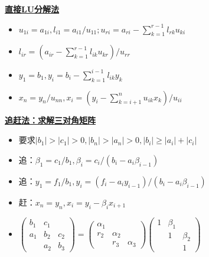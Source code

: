 \documentclass[UTF8,a4paper,landscape,compress]{paper}
\renewcommand{\subsection}[1]{{\small\textbf{\underline{#1}}}\\ }
\newcommand{\List}[1]{\begin{itemize}[fullwidth,itemindent=0em] #1 \end{itemize}}
\begin{document}
\begin{multicols}{4}
    \subsection{直接LU分解法}
    \List{
        \item {$u_{1i} = a_{1i}, l_{i1} = a_{i1} / u_{11}; u_{ri} = a_{ri} - \sum_{k=1}^{r-1} l_{rk}u_{ki}$}
        \item {$l_{ir} = (a_{ir} - \sum_{k=1}^{r-1} l_{ik}u_{kr})/ u_{rr}$}
        \item {$y_1 = b_1, y_i = b_i - \sum_{k=1}^{i-1} l_{ik}y_k$}
        \item {$x_n = y_n / u_{nn},x_i = (y_i-\sum_{k=i+1}^nu_{ik}x_k) / u_{ii}$}
    }
    \subsection{追赶法：求解三对角矩阵}
    \List{
        \item {要求$|b_1| >|c_1| >0,|b_n| > |a_n| > 0, |b_i| \ge |a_i| + |c_i|$}
        \item {追：$\beta_1 = c_1/b_1, \beta_i = c_i/(b_i-a_i\beta_{i-1})$}
        \item {追：$y_1 = f_1 / b_1, y_i = (f_i - a_iy_{i-1})/(b_i - a_i\beta_{i-1})$}
        \item {赶：$x_n = y_n,x_i = y_i -\beta_ix_{i+1}$}
        \item {$\begin{pmatrix} b_1 & c_1 & \\ a_1 & b_2 & c_2 \\ & a_2 & b_3 \end{pmatrix} = \begin{pmatrix} \alpha_1 & & \\ r_2 & \alpha_2 & \\ & r_3 & \alpha_3 \end{pmatrix} \begin{pmatrix} 1 & \beta_1 & \\ & 1 & \beta_2 \\ & & 1\end{pmatrix}$}
    }

\end{multicols}
\end{document}
